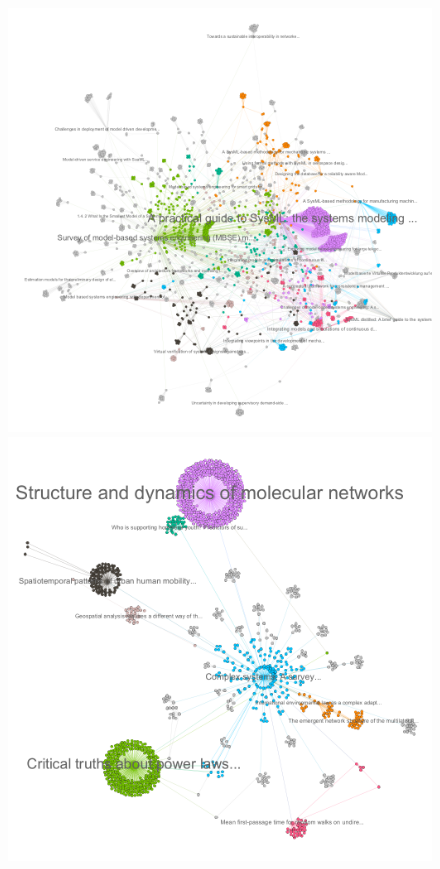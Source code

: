\documentclass[runningheads,a4paper]{llncs2e/llncs}
\begin{document}






\begin{figure}
	\includegraphics[width=\linewidth,height=0.6\textheight]{figures/cseng.png}\\
	\includegraphics[width=\linewidth,height=0.6\textheight]{figures/csnatural.png}

\end{figure}
\end{document}
